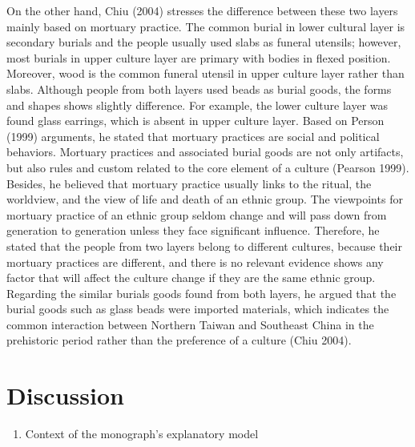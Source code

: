 \documentclass[10pt]{article}
\begin{document}
On the other hand, Chiu (2004) stresses the difference between these two
layers mainly based on mortuary practice. The common burial in lower
cultural layer is secondary burials and the people usually used slabs as
funeral utensils; however, most burials in upper culture layer are
primary with bodies in flexed position. Moreover, wood is the common
funeral utensil in upper culture layer rather than slabs. Although
people from both layers used beads as burial goods, the forms and shapes
shows slightly difference. For example, the lower culture layer was
found glass earrings, which is absent in upper culture layer. Based on
Person (1999) arguments, he stated that mortuary practices are social
and political behaviors. Mortuary practices and associated burial goods
are not only artifacts, but also rules and custom related to the core
element of a culture (Pearson 1999). Besides, he believed that mortuary
practice usually links to the ritual, the worldview, and the view of
life and death of an ethnic group. The viewpoints for mortuary practice
of an ethnic group seldom change and will pass down from generation to
generation unless they face significant influence. Therefore, he stated
that the people from two layers belong to different cultures, because
their mortuary practices are different, and there is no relevant
evidence shows any factor that will affect the culture change if they
are the same ethnic group. Regarding the similar burials goods found
from both layers, he argued that the burial goods such as glass beads
were imported materials, which indicates the common interaction between
Northern Taiwan and Southeast China in the prehistoric period rather
than the preference of a culture (Chiu 2004).

\section*{Discussion}\label{discussion}

\begin{enumerate}
\def\labelenumi{\arabic{enumi}.}
\itemsep1pt\parskip0pt
\item
  Context of the monograph's explanatory model
\end{enumerate}
\end{document}
